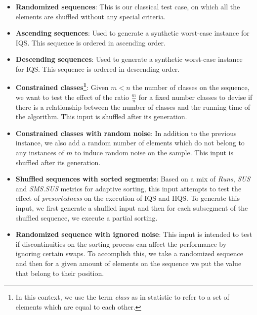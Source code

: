 \begin{itemize}
        
    \item{\textbf{Randomized sequences}: 
    This is our classical test case, on which all the elements are shuffled without any special criteria.}

    \item{\textbf{Ascending sequences}: 
    Used to generate a synthetic worst-case instance for IQS. This sequence is ordered in ascending order.}

    \item{\textbf{Descending sequences}: 
    Used to generate a synthetic worst-case instance for IQS. This sequence is ordered in descending order.}

    \item{\textbf{Constrained classes\footnote{In this context, we use the term \textit{class} as in statistic to refer to a set of elements which are equal to each other.}}: 
    Given $m < n$ the number of classes on the sequence, we want to test the effect of the ratio $\frac{m}{n}$ for a fixed number classes to devise if there is a relationship between the number of classes and the running time of the algorithm. This input is shuffled after its generation.}

    \item{\textbf{Constrained classes with random noise}: 
    In addition to the previous instance, we also add a random number of elements which do not belong to any instances of $m$ to induce random noise on the sample. This input is shuffled after its generation.}

    \item{\textbf{Shuffled sequences with sorted segments}: 
    Based on a mix of \textit{Runs}, \textit{SUS} and \textit{SMS.SUS} metrics for adaptive sorting, this input attempts to test the effect of \textit{presortedness} on the execution of IQS and IIQS. To generate this input, we first generate a shuffled input and then for each subsegment of the shuffled sequence, we execute a partial sorting.}

    \item{\textbf{Randomized sequence with ignored noise}: 
    This input is intended to test if discontinuities on the sorting process can affect the performance by ignoring certain swaps. To accomplish this, we take a randomized sequence and then for a given amount of elements on the sequence we put the value that belong to their position.}
\end{itemize}

